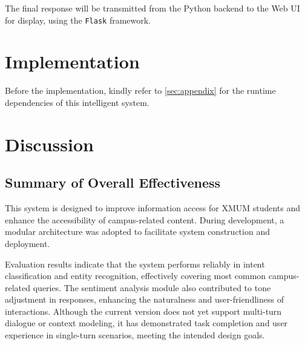 \documentclass{xum_review}
\begin{document}
	The final response will be transmitted from the Python backend to the Web UI
	for display, using the \texttt{Flask} framework.

\section{Implementation}
    
	Before the implementation, kindly refer to \cref{sec:appendix} for the runtime dependencies
	of this intelligent system.
	




\section{Discussion}

	\subsection{Summary of Overall Effectiveness}

	This system is designed to improve information access for XMUM
	students and enhance the accessibility of campus-related content. During
	development, a modular architecture was adopted to facilitate system
	construction and deployment.

	Evaluation results indicate that the system performs reliably in intent
	classification and entity recognition, effectively covering most common
	campus-related queries. The sentiment analysis module also contributed to
	tone adjustment in responses, enhancing the naturalness and
	user-friendliness of interactions. Although the current version does not yet
	support multi-turn dialogue or context modeling, it has demonstrated task
	completion and user experience in single-turn scenarios, meeting the
	intended design goals.
\end{document}
